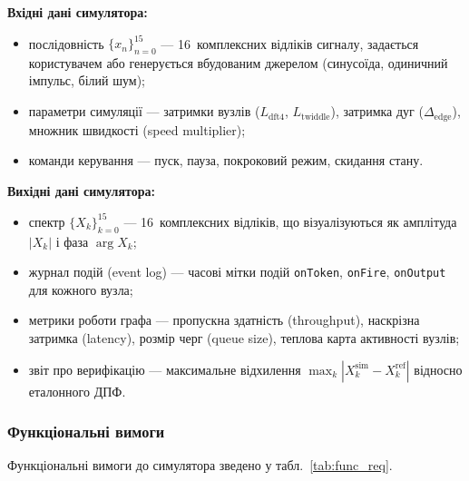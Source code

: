 \textbf{Вхідні дані симулятора:}
\begin{itemize}
  \item послідовність $\{x_n\}_{n=0}^{15}$ --- 16~комплексних
        відліків сигналу, задається користувачем або генерується
        вбудованим джерелом (синусоїда, одиничний імпульс,
        білий шум);
  \item параметри симуляції --- затримки вузлів
        ($L_{\mathrm{dft4}}$, $L_{\mathrm{twiddle}}$), затримка
        дуг ($\Delta_{\mathrm{edge}}$), множник швидкості
        (speed multiplier);
  \item команди керування --- пуск, пауза, покроковий режим,
        скидання стану.
\end{itemize}

\textbf{Вихідні дані симулятора:}
\begin{itemize}
  \item спектр $\{X_k\}_{k=0}^{15}$ --- 16~комплексних відліків,
        що візуалізуються як амплітуда $|X_k|$ і фаза $\arg X_k$;
  \item журнал подій (event log) --- часові мітки подій
        \texttt{onToken}, \texttt{onFire}, \texttt{onOutput} для
        кожного вузла;
  \item метрики роботи графа --- пропускна здатність (throughput),
        наскрізна затримка (latency), розмір черг (queue size),
        теплова карта активності вузлів;
  \item звіт про верифікацію --- максимальне відхилення $\max_k
        |X_k^{\mathrm{sim}} - X_k^{\mathrm{ref}}|$ відносно
        еталонного ДПФ.
\end{itemize}

\subsubsection*{Функціональні вимоги}

Функціональні вимоги до симулятора зведено у табл.~\ref{tab:func_req}.

